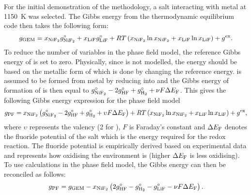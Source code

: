For the initial demonstration of the methodology, a  salt interacting with  metal at \SI{1150}{\kelvin} was selected. The Gibbs energy from the thermodynamic equilibrium code then takes the following form:
\begin{equation*}
	g_\text{GEM} = x_{\ce{NiF2}} g_{\ce{NiF2}}^\circ + x_{\ce{LiF}} g_{\ce{LiF}}^\circ + RT\left( x_{\ce{NiF2}} \ln{x_{\ce{NiF2}}} + x_{\ce{LiF}} \ln{x_{\ce{LiF}}} \right) + g^\text{ex}.
\end{equation*}
To reduce the number of variables in the phase field model, the reference Gibbs energy of  is set to zero. Physically, since  is not modelled, the energy should be based on the metallic form of  which is done by changing the reference energy.  is assumed to be formed from  metal by reducing    into  and the Gibbs energy of formation of  is then equal to $g_{\ce{NiF2}}^\circ - 2 g_{\ce{HF}}^\circ + g_{\ce{H2}}^\circ + \nu F \Delta E_{\ce{F}}$. This gives the following Gibbs energy expression for the phase field model
\begin{equation*}
	g_\text{PF} = x_{\ce{NiF2}} \left( g_{\ce{NiF2}}^\circ - 2 g_{\ce{HF}}^\circ + g_{\ce{H2}}^\circ + \upsilon F \Delta E_{\ce{F}} \right) + RT\left( x_{\ce{NiF2}} \ln{x_{\ce{NiF2}}} + x_{\ce{LiF}} \ln{x_{\ce{LiF}}} \right) + g^\text{ex},
\end{equation*}
where $\upsilon$ represents the valency (2 for ), $F$ is Faraday's constant and $\Delta E_{\ce{F}}$ denotes the fluoride potential of the salt which is the energy required for the  redox reaction. The fluoride potential is empirically derived based on experimental data and represents how oxidising the environment is (higher $\Delta E_{\ce{F}}$ is less oxidising). To use {\GEM} calculations in the phase field model, the Gibbs energy can then be reconciled as follows:
\begin{equation*}
	g_\text{PF} = g_\text{GEM} - x_{\ce{NiF2}} \left( 2 g_{\ce{HF}}^\circ - g_{\ce{H2}}^\circ - g_{\ce{LiF}}^\circ - \nu F \Delta E_{\ce{F}} \right).
\end{equation*}


